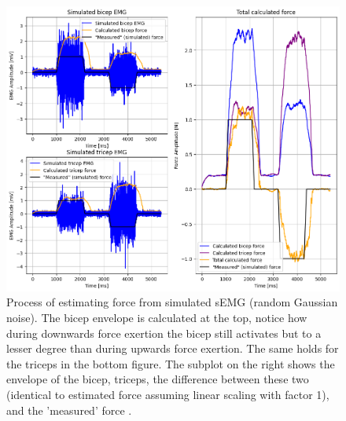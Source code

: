 \begin{figure}[h!t]
	\begin{center}
		\includegraphics[width=1.0\columnwidth]{images/force_simulation.png}
	\end{center}
	\caption{Process of estimating force from simulated sEMG (random Gaussian noise). The bicep envelope is calculated at the top, notice how during downwards force exertion the bicep still activates but to a lesser degree than during upwards force exertion. The same holds for the triceps in the bottom figure. The subplot on the right shows the envelope of the bicep, triceps, the difference between these two (identical to estimated force assuming linear scaling with factor 1), and the 'measured' force .}
	\label{fig:force_simulation}
\end{figure}